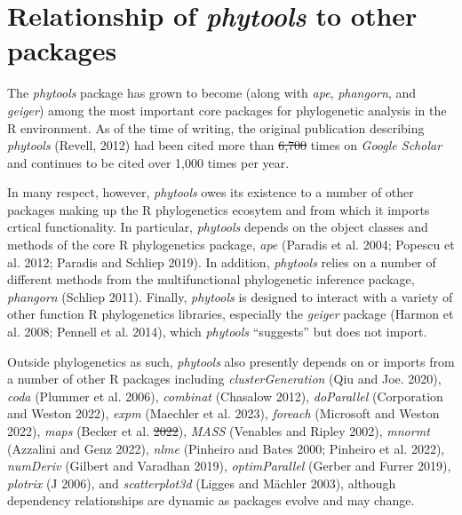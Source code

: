 \documentclass[fleqn,10pt,lineno]{wlpeerj}
\providecommand{\DIFaddtex}[1]{{\protect\color{blue}\uwave{#1}}} %
\providecommand{\DIFdeltex}[1]{{\protect\color{red}\sout{#1}}}                      %
\providecommand{\DIFaddbegin}{} %
\providecommand{\DIFaddend}{} %
\providecommand{\DIFdelbegin}{} %
\providecommand{\DIFdelend}{} %
\providecommand{\DIFadd}[1]{\texorpdfstring{\DIFaddtex{#1}}{#1}} %
\providecommand{\DIFdel}[1]{\texorpdfstring{\DIFdeltex{#1}}{}} %
\newcommand{\DIFscaledelfig}{0.5}
\newlength{\DIFdelgraphicswidth} %
\newlength{\DIFdelgraphicsheight} %
\newcommand{\DIFaddincludegraphics}[2][]{{\color{blue}\fbox{\DIFOincludegraphics[#1]{#2}}}} %
\newcommand{\DIFdelincludegraphics}[2][]{%
\sbox{\DIFdelgraphicsbox}{\DIFOincludegraphics[#1]{#2}}%
\settoboxwidth{\DIFdelgraphicswidth}{\DIFdelgraphicsbox} %
\settoboxtotalheight{\DIFdelgraphicsheight}{\DIFdelgraphicsbox} %
\scalebox{\DIFscaledelfig}{%
\parbox[b]{\DIFdelgraphicswidth}{\usebox{\DIFdelgraphicsbox}\\[-\baselineskip] \rule{\DIFdelgraphicswidth}{0em}}\llap{\resizebox{\DIFdelgraphicswidth}{\DIFdelgraphicsheight}{%
\setlength{\unitlength}{\DIFdelgraphicswidth}%
\begin{picture}(1,1)%
\thicklines\linethickness{2pt} %
{\color[rgb]{1,0,0}\put(0,0){\framebox(1,1){}}}%
{\color[rgb]{1,0,0}\put(0,0){\line( 1,1){1}}}%
{\color[rgb]{1,0,0}\put(0,1){\line(1,-1){1}}}%
\end{picture}%
}\hspace*{3pt}}} %
} %
\DeclareRobustCommand{\DIFaddbegin}{\DIFOaddbegin \let\includegraphics\DIFaddincludegraphics} %
\DeclareRobustCommand{\DIFaddend}{\DIFOaddend \let\includegraphics\DIFOincludegraphics} %
\DeclareRobustCommand{\DIFdelbegin}{\DIFOdelbegin \let\includegraphics\DIFdelincludegraphics} %
\DeclareRobustCommand{\DIFdelend}{\DIFOaddend \let\includegraphics\DIFOincludegraphics} %
\begin{document}
\hypertarget{relationship-of-phytools-to-other-packages}{%
\section{\texorpdfstring{Relationship of \emph{phytools} to other
packages}{Relationship of phytools to other packages}}\label{relationship-of-phytools-to-other-packages}}

The \emph{phytools} package has grown to become (along with \emph{ape},
\emph{phangorn}, and \emph{geiger}) among the most important core
packages for phylogenetic analysis in the R environment. As of the time
of writing, the original publication describing \emph{phytools} (Revell,
2012) had been cited more than \DIFdelbegin \DIFdel{6,700 }\DIFdelend \DIFaddbegin \DIFadd{7,300 }\DIFaddend times on \emph{Google Scholar} and
continues to be cited over 1,000 times per year.

In many respect, however, \emph{phytools} owes its existence to a number
of other packages making up the R phylogenetics ecosytem and from which
it imports crtical functionality. In particular, \emph{phytools} depends
on the object classes and methods of the core R phylogenetics package,
\emph{ape} (Paradis et al. 2004; Popescu et al. 2012; Paradis and
Schliep 2019). In addition, \emph{phytools} relies on a number of
different methods from the multifunctional phylogenetic inference
package, \emph{phangorn} (Schliep 2011). Finally, \emph{phytools} is
designed to interact with a variety of other function R phylogenetics
libraries, especially the \emph{geiger} package (Harmon et al. 2008;
Pennell et al. 2014), which \emph{phytools} ``suggests'' but does not
import.

Outside phylogenetics as such, \emph{phytools} also presently depends on
or imports from a number of other R packages including
\emph{clusterGeneration} (Qiu and Joe. 2020), \emph{coda} (Plummer et
al. 2006), \emph{combinat} (Chasalow 2012), \emph{doParallel}
(Corporation and Weston 2022), \emph{expm} (Maechler et al. 2023),
\emph{foreach} (Microsoft and Weston 2022), \emph{maps} (Becker et al.
\DIFdelbegin \DIFdel{2022}\DIFdelend \DIFaddbegin \DIFadd{2022a}\DIFaddend ), \emph{MASS} (Venables and Ripley 2002), \emph{mnormt} (Azzalini
and Genz 2022), \emph{nlme} (Pinheiro and Bates 2000; Pinheiro et al.
2022), \emph{numDeriv} (Gilbert and Varadhan 2019), \emph{optimParallel}
(Gerber and Furrer 2019), \emph{plotrix} (J 2006), and
\emph{scatterplot3d} (Ligges and Mächler 2003), although dependency
relationships are dynamic as packages evolve and may change.
\end{document}
